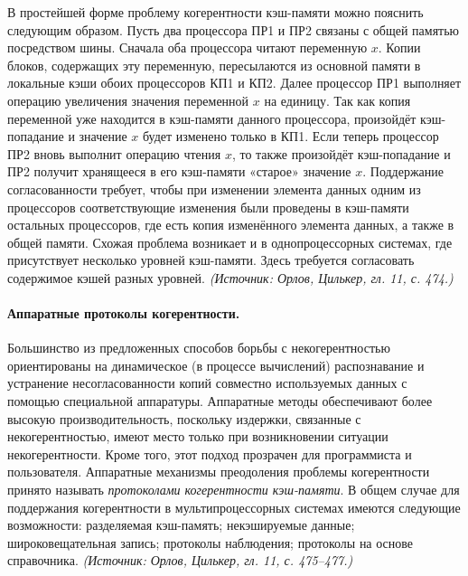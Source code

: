 \documentclass[a4paper,12pt]{article}
\begin{document}
В простейшей форме проблему когерентности кэш-памяти можно пояснить следующим образом. Пусть два процессора ПР1 и ПР2 связаны с общей памятью посредством шины. Сначала оба процессора читают переменную \(x\). Копии блоков, содержащих эту переменную, пересылаются из основной памяти в локальные кэши обоих процессоров КП1 и КП2. Далее процессор ПР1 выполняет операцию увеличения значения переменной \(x\) на единицу. Так как копия переменной уже находится в кэш-памяти данного процессора, произойдёт кэш-попадание и значение \(x\) будет изменено только в КП1. Если теперь процессор ПР2 вновь выполнит операцию чтения \(x\), то также произойдёт кэш-попадание и ПР2 получит хранящееся в его кэш-памяти «старое» значение \(x\). Поддержание согласованности требует, чтобы при изменении элемента данных одним из процессоров соответствующие изменения были проведены в кэш-памяти остальных процессоров, где есть копия изменённого элемента данных, а также в общей памяти. Схожая проблема возникает и в однопроцессорных системах, где присутствует несколько уровней кэш-памяти. Здесь требуется согласовать содержимое кэшей разных уровней.
\textit{(Источник: Орлов, Цилькер, гл. 11, с. 474.)}

\paragraph{Аппаратные протоколы когерентности.}
Большинство из предложенных способов борьбы с некогерентностью ориентированы на динамическое (в процессе вычислений) распознавание и устранение несогласованности копий совместно используемых данных с помощью специальной аппаратуры. Аппаратные методы обеспечивают более высокую производительность, поскольку издержки, связанные с некогерентностью, имеют место только при возникновении ситуации некогерентности. Кроме того, этот подход прозрачен для программиста и пользователя. Аппаратные механизмы преодоления проблемы когерентности принято называть \emph{протоколами когерентности кэш-памяти}. В общем случае для поддержания когерентности в мультипроцессорных системах имеются следующие возможности: разделяемая кэш-память; некэшируемые данные; широковещательная запись; протоколы наблюдения; протоколы на основе справочника.
\textit{(Источник: Орлов, Цилькер, гл. 11, с. 475--477.)}
\end{document}
